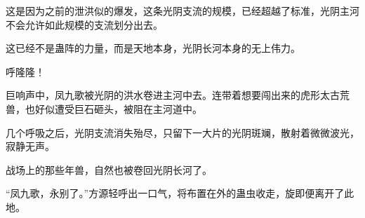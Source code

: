 \begin{this_body}
这是因为之前的泄洪似的爆发，这条光阴支流的规模，已经超越了标准，光阴主河不会允许如此规模的支流划分出去。

这已经不是蛊阵的力量，而是天地本身，光阴长河本身的无上伟力。

呼隆隆！

巨响声中，凤九歌被光阴的洪水卷进主河中去。连带着想要闯出来的虎形太古荒兽，也好似遭受巨石砸头，被阻在主河道中。

几个呼吸之后，光阴支流消失殆尽，只留下一大片的光阴斑斓，散射着微微波光，寂静无声。

战场上的那些年兽，自然也被卷回光阴长河了。

“凤九歌，永别了。”方源轻呼出一口气，将布置在外的蛊虫收走，旋即便离开了此地。

\end{this_body}

